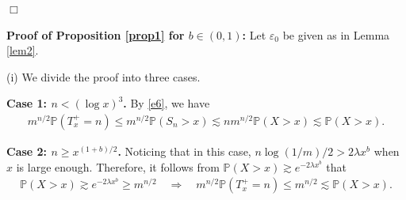 \documentclass[10pt,a4paper]{amsart}
\numberwithin{equation}{section}
\begin{document}
\hfill$\Box$

\noindent
\textbf{Proof of Proposition \ref{prop1} for $b\in (0,1)$:}
Let $\varepsilon_0$ be given as in Lemma \ref{lem2}. 

(i) We divide the proof into three cases.

\noindent
{\bf Case 1: $n<(\log x)^3$.}
 By \eqref{e6}, we have
  \begin{align}\label{e7}
		m^{n/2}\mathbb{P}(T_x^+=n)\leq m^{n/2} \mathbb{P}(S_n>x) \lesssim n m^{n/2} \mathbb{P}(X>x)\lesssim   \mathbb{P}(X>x).
\end{align}

\noindent
{\bf Case 2: $n\geq x^{(1+b)/2}$.}
Noticing that in this case, $n\log (1/m) /2 >2\lambda x^b$ when $x$ is large enough. Therefore, it follows from $\mathbb{P}(X>x)\gtrsim e^{-2\lambda x^b}$  that 
\begin{align}\label{e8}
	\mathbb{P}(X>x)\gtrsim e^{-2\lambda x^b} \geq m^{n/2} \quad  \Longrightarrow \quad m^{n/2}\mathbb{P}(T_x^+=n)\leq m^{n/2} \lesssim  	\mathbb{P}(X>x).
\end{align}
\end{document}

